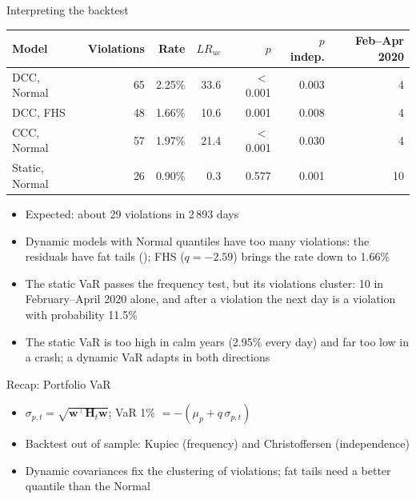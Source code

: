\begin{frame}{Interpreting the backtest}
\itemsize{\footnotesize}
\begin{center}
\footnotesize
\begin{tabular}{lrrrrrr}
\toprule
\textbf{Model} & Violations & Rate & $LR_{uc}$ & $p$ & $p$ indep. & Feb--Apr 2020 \\
\midrule
DCC, Normal & 65 & 2.25\% & 33.6 & $<$\,0.001 & 0.003 & 4 \\
DCC, FHS & 48 & 1.66\% & 10.6 & 0.001 & 0.008 & 4 \\
CCC, Normal & 57 & 1.97\% & 21.4 & $<$\,0.001 & 0.030 & 4 \\
Static, Normal & 26 & 0.90\% & 0.3 & 0.577 & 0.001 & 10 \\
\bottomrule
\end{tabular}
\end{center}
\begin{itemize}
    \item Expected: about 29 violations in 2\,893 days
    \item Dynamic models with Normal quantiles have too many violations: the residuals have fat tails (); FHS ($q = -2.59$) brings the rate down to 1.66\%
    \item The static VaR passes the frequency test, but its violations cluster: 10 in February--April 2020 alone, and after a violation the next day is a violation with probability 11.5\%
    \item The static VaR is too high in calm years (2.95\% every day) and far too low in a crash; a dynamic VaR adapts in both directions
\end{itemize}
\end{frame}

\begin{frame}{Recap: Portfolio VaR}
\itemsize{\small}
\begin{itemize}
    \item $\sigma_{p,t} = \sqrt{\mathbf{w}^\top\mathbf{H}_t\mathbf{w}}$; VaR 1\% $= -(\mu_p + q\,\sigma_{p,t})$
    \item Backtest out of sample: Kupiec (frequency) and Christoffersen (independence)
    \item Dynamic covariances fix the clustering of violations; fat tails need a better quantile than the Normal
\end{itemize}
\end{frame}


